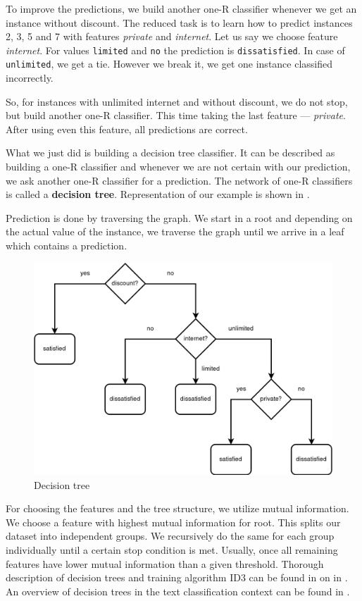 To improve the predictions, we build another one-R classifier
whenever we get an instance without discount.
The reduced task is to learn how to predict instances 2, 3, 5 and 7 with features \textit{private} and \textit{internet}.
Let us say we choose feature \textit{internet}.
For values \texttt{limited} and \texttt{no} the prediction is \texttt{dissatisfied}.
In case of \texttt{unlimited}, we get a tie.
However we break it, we get one instance classified incorrectly.

So, for instances with unlimited internet and without discount, we do not stop, but
build another one-R classifier.
This time taking the last feature --- \textit{private}.
After using even this feature, all predictions are correct.

What we just did is building a decision tree classifier.
It can be described as
building a one-R classifier and whenever we are not certain with our prediction,
we ask another one-R classifier for a prediction.
The network of one-R classifiers is called a \textbf{decision tree}.
Representation of our example is shown in .

Prediction is done by traversing the graph.
We start in a root and depending on the actual value of the instance,
we traverse the graph until we arrive in a leaf which contains a prediction.

\begin{figure}[h]
	\centering
	\includegraphics[width=\textwidth]{figures/decisiontree.png}
	\caption{Decision tree} \label{fig:tree}
\end{figure}

For choosing the features and the tree structure,
we utilize mutual information.
We choose a feature with highest mutual information for root.
This splits our dataset into independent groups.
We recursively do the same for each group individually until a certain stop condition is met.
Usually, once all remaining features have lower mutual information than a given threshold.
Thorough description of decision trees and training algorithm ID3 can be found in
\citet{Quinlan1986} on in \citet{safavian1991survey}.
An overview of decision trees in the text classification context can be found in \citet{khan2010review}.






